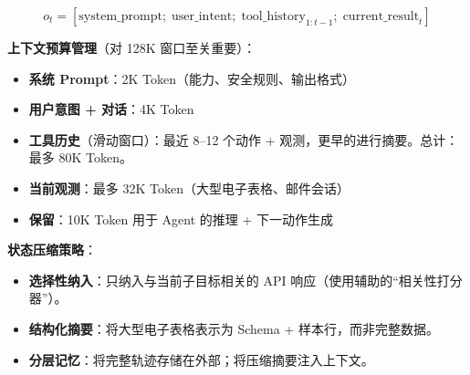 \begin{equation}
o_t = [\text{system\_prompt};\; \text{user\_intent};\; \text{tool\_history}_{1:t-1};\; \text{current\_result}_t]
\end{equation}

\textbf{上下文预算管理}（对 128K 窗口至关重要）：

\begin{itemize}
  \item \textbf{系统 Prompt}：2K Token（能力、安全规则、输出格式）
  \item \textbf{用户意图 + 对话}：4K Token
  \item \textbf{工具历史}（滑动窗口）：最近 8--12 个动作 + 观测，更早的进行摘要。总计：最多 80K Token。
  \item \textbf{当前观测}：最多 32K Token（大型电子表格、邮件会话）
  \item \textbf{保留}：10K Token 用于 Agent 的推理 + 下一动作生成
\end{itemize}

\textbf{状态压缩策略}：

\begin{itemize}
  \item \textbf{选择性纳入}：只纳入与当前子目标相关的 API 响应（使用辅助的``相关性打分器''）。
  \item \textbf{结构化摘要}：将大型电子表格表示为 Schema + 样本行，而非完整数据。
  \item \textbf{分层记忆}：将完整轨迹存储在外部；将压缩摘要注入上下文。
\end{itemize}

